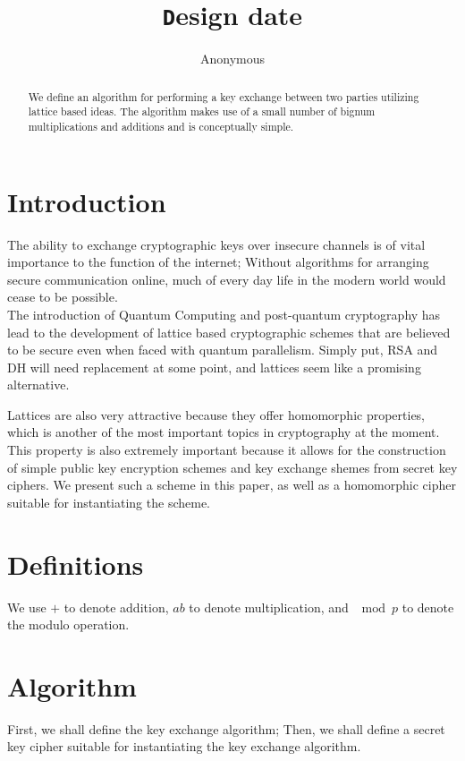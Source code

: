 \documentclass[preprint]{iacrtrans}
\author{Anonymous\inst{1}}
\institute{City, State \email{address@provider.com}}
\title[\texttt Design date]{\texttt Design date}
\begin{document}
\maketitle


\begin{abstract}
  We define an algorithm for performing a key exchange between two parties utilizing lattice based ideas. The algorithm makes use of a small number of bignum multiplications and additions and is conceptually simple.\\ 
\end{abstract}

\todototoc
\listoftodos

\section{Introduction}
 The ability to exchange cryptographic keys over insecure channels is of vital importance to the function of the internet; Without algorithms for arranging secure communication online, much of every day life in the modern world would cease to be possible.\\

The introduction of Quantum Computing and post-quantum cryptography has lead to the development of lattice based cryptographic schemes that are believed to be secure even when faced with quantum parallelism. Simply put, RSA and DH will need replacement at some point, and lattices seem like a promising alternative.

Lattices are also very attractive because they offer homomorphic properties, which is another of the most important topics in cryptography at the moment. This property is also extremely important because it allows for the construction of simple public key encryption schemes and key exchange shemes from secret key ciphers. We present such a scheme in this paper, as well as a homomorphic cipher suitable for instantiating the scheme.

\section{Definitions}
We use $+$ to denote addition, $ab$ to denote multiplication, and $\mod p$ to denote the modulo operation.

\section{Algorithm}
First, we shall define the key exchange algorithm; Then, we shall define a secret key cipher suitable for instantiating the key exchange algorithm.
\end{document}
